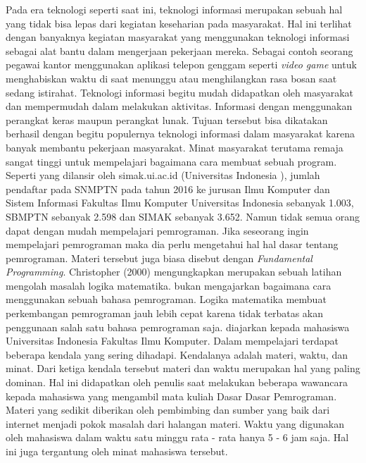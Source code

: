 Pada era teknologi seperti saat ini, teknologi informasi merupakan sebuah hal yang tidak bisa lepas dari kegiatan keseharian pada masyarakat. Hal ini terlihat dengan banyaknya kegiatan masyarakat yang menggunakan teknologi informasi sebagai alat bantu dalam mengerjaan pekerjaan mereka. Sebagai contoh seorang pegawai kantor menggunakan aplikasi telepon genggam seperti \textit{video game} untuk menghabiskan waktu di saat menunggu atau menghilangkan rasa bosan saat sedang istirahat.
\linebreak
\linebreak
Teknologi informasi begitu mudah didapatkan oleh masyarakat dan mempermudah dalam melakukan aktivitas. Informasi dengan menggunakan perangkat keras maupun perangkat lunak. Tujuan tersebut bisa dikatakan berhasil dengan begitu populernya teknologi informasi dalam masyarakat karena banyak membantu pekerjaan masyarakat.
\linebreak\linebreak
Minat masyarakat terutama remaja sangat tinggi untuk mempelajari bagaimana cara membuat sebuah program. Seperti yang dilansir oleh simak.ui.ac.id (Universitas Indonesia \citeyear{article.simak}), jumlah pendaftar pada SNMPTN pada tahun 2016 ke jurusan Ilmu Komputer dan Sistem Informasi Fakultas Ilmu Komputer Universitas Indonesia sebanyak 1.003, SBMPTN sebanyak 2.598 dan SIMAK sebanyak 3.652. Namun tidak semua orang dapat dengan mudah mempelajari pemrograman. Jika seseorang ingin mempelajari pemrograman maka dia perlu mengetahui hal hal dasar tentang pemrograman. Materi tersebut juga biasa disebut dengan \textit{Fundamental Programming}.
\linebreak\linebreak
Christopher (2000) mengungkapkan \ddp merupakan sebuah latihan mengolah masalah logika matematika. \DDP bukan mengajarkan bagaimana cara menggunakan sebuah bahasa pemrograman. Logika matematika membuat perkembangan pemrograman jauh lebih cepat karena tidak terbatas akan penggunaan salah satu bahasa pemrograman saja.
\linebreak\linebreak
\DDP diajarkan kepada mahasiswa Universitas Indonesia Fakultas Ilmu Komputer. Dalam mempelajari \ddp terdapat beberapa kendala yang sering dihadapi. Kendalanya adalah materi, waktu, dan minat. Dari ketiga kendala tersebut materi dan waktu merupakan hal yang paling dominan. Hal ini didapatkan oleh penulis saat melakukan beberapa wawancara kepada mahasiswa yang mengambil mata kuliah Dasar Dasar Pemrograman. Materi yang sedikit diberikan oleh pembimbing dan sumber yang baik dari internet menjadi pokok masalah dari halangan materi. Waktu yang digunakan oleh mahasiswa dalam waktu satu minggu rata - rata hanya 5 - 6 jam saja. Hal ini juga tergantung oleh minat mahasiswa tersebut.
